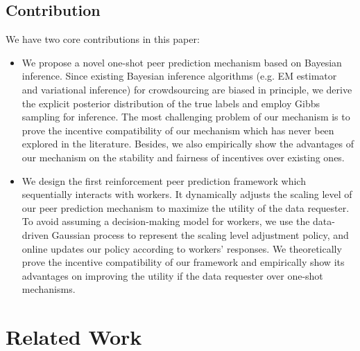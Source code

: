 \documentclass{article}
\begin{document}
\subsection{Contribution}
We have two core contributions in this paper:
\begin{itemize}
\item We propose a novel one-shot peer prediction mechanism based on Bayesian inference. Since existing Bayesian inference algorithms (e.g. EM estimator and variational inference) for crowdsourcing are biased in principle, we derive the explicit posterior distribution of the true labels and employ Gibbs sampling for inference. The most challenging problem of our mechanism is to prove the incentive compatibility of our mechanism which has never been explored in the literature. Besides, we also empirically show the advantages of our mechanism on the stability and fairness of incentives over existing ones.
\item We design the first reinforcement peer prediction framework which sequentially interacts with workers. It dynamically adjusts the scaling level of our peer prediction mechanism to maximize the utility of the data requester. To avoid assuming a decision-making model for workers, we use the data-driven Gaussian process to represent the scaling level adjustment policy, and online updates our policy according to workers' responses. We theoretically prove the incentive compatibility of our framework and empirically show its advantages on improving the utility if the data requester over one-shot mechanisms.
\end{itemize}

\section{Related Work}

\newpage
\end{document}
